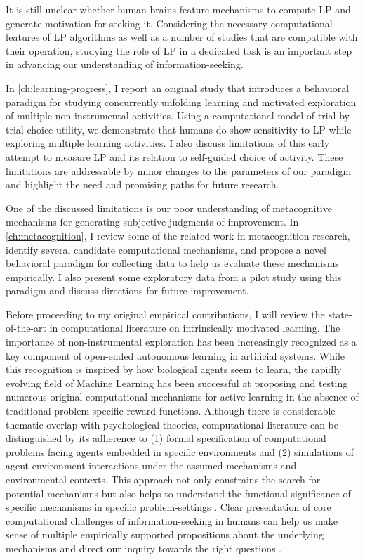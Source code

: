 It is still unclear whether human brains feature mechanisms to compute \ac{LP} and generate motivation for seeking it. Considering the necessary computational features of \ac{LP} algorithms as well as a number of studies that are compatible with their operation, studying the role of \ac{LP} in a dedicated task is an important step in advancing our understanding of information-seeking.

In \autoref{ch:learning-progress}, I report an original study that introduces a behavioral paradigm for studying concurrently unfolding learning and motivated exploration of multiple non-instrumental activities. Using a computational model of trial-by-trial choice utility, we demonstrate that humans do show sensitivity to \ac{LP} while exploring multiple learning activities. I also discuss limitations of this early attempt to measure \ac{LP} and its relation to self-guided choice of activity. These limitations are addressable by minor changes to the parameters of our paradigm and highlight the need and promising paths for future research.

One of the discussed limitations is our poor understanding of metacognitive mechanisms for generating subjective judgments of improvement. In \autoref{ch:metacognition}, I review some of the related work in metacognition research, identify several candidate computational mechanisms, and propose a novel behavioral paradigm for collecting data to help us evaluate these mechanisms empirically. I also present some exploratory data from a pilot study using this paradigm and discuss directions for future improvement.

Before proceeding to my original empirical contributions, I will review the state-of-the-art in computational literature on intrinsically motivated learning. The importance of non-instrumental exploration has been increasingly recognized as a key component of open-ended autonomous learning in artificial systems. While this recognition is inspired by how biological agents seem to learn, the rapidly evolving field of Machine Learning has been successful at proposing and testing numerous original computational mechanisms for active learning in the absence of traditional problem-specific reward functions. Although there is considerable thematic overlap with psychological theories, computational literature can be distinguished by its adherence to (1) formal specification of computational problems facing agents embedded in specific environments and (2) simulations of agent-environment interactions under the assumed mechanisms and environmental contexts. This approach not only constrains the search for potential mechanisms but also helps to understand the functional significance of specific mechanisms in specific problem-settings \cite[e.g., ][]{lopes_strategic_2012,moulin-frier_exploration_2013}. Clear presentation of core computational challenges of information-seeking in humans can help us make sense of multiple empirically supported propositions about the underlying mechanisms \cite{dubey_reconciling_2020,brandle_what_2020} and direct our inquiry towards the right questions \cite{coenen_asking_2019}.